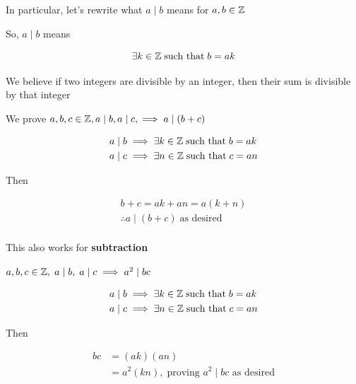 \documentclass[../../Main.tex]{subfiles}
\begin{document}
In particular, let's rewrite what $a \mid b$ means for $a, b \in \mathbb{Z}$

So, $a \mid b$ means

$$\exists k \in \mathbb{Z} \; \text{such that} \; b = ak$$

We believe if two integers are divisible by an integer, then their sum is divisible by that integer

We prove $a, b, c \in \mathbb{Z}, a \mid b, a \mid c, \implies a \mid (b + c)$

\begin{poof}
    \begin{align*}
        a \mid b & \implies \exists k \in \mathbb{Z} \; \text{such that} \; b = ak \\
        a \mid c & \implies \exists n \in \mathbb{Z} \; \text{such that} \; c = an \\
    \end{align*}

    Then

    \begin{align*}
        b + c = ak + an = a(k + n) \\
        \therefore a \mid (b + c) \; \text{as desired} \\
    \end{align*}

    \begin{note}
        This also works for \textbf{subtraction}
    \end{note}
\end{poof}

\begin{proposition}
    $a, b, c \in \mathbb{Z}, \; a \mid b, \; a \mid c \implies a^2 \mid bc$

    \begin{poof}
        \begin{align*}
            a \mid b &\implies \exists k \in \mathbb{Z} \; \text{such that} \; b = ak \\
            a \mid c &\implies \exists n \in \mathbb{Z} \; \text{such that} \; c = an \\
        \end{align*}

        Then

        \begin{align*}
            bc &= (ak)(an) \\
            &= a^2 (kn), \; \text{proving $a^2 \mid bc$ as desired}
        \end{align*}
    \end{poof}
\end{proposition}
\end{document}
